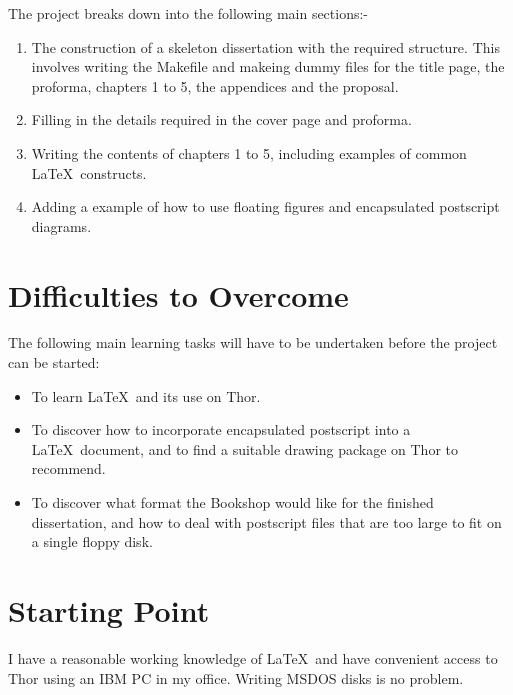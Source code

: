 The project breaks down into the following main sections:-

\begin{enumerate}

\item The construction of a skeleton dissertation with the required 
structure. This involves writing the Makefile and makeing dummy files
for the title page, the proforma, chapters 1 to 5, the appendices and
the proposal.

\item Filling in the details required in the cover page and proforma.

\item Writing the contents of chapters 1 to 5, including examples
of common \LaTeX\ constructs.

\item Adding a example of how to use floating figures and encapsulated
postscript diagrams.

\end{enumerate}

\section*{Difficulties to Overcome}

The following main learning tasks will have to be undertaken before 
the project can be started:

\begin{itemize}

\item To learn \LaTeX\ and its use on Thor.

\item To discover how to incorporate encapsulated postscript into
a \LaTeX\ document, and to find a suitable drawing package on Thor
to recommend.

\item To discover what format the Bookshop would like for the finished
dissertation, and how to deal with postscript files that are too
large to fit on a single floppy disk.

\end{itemize}



\section*{Starting Point}

I have a reasonable working knowledge of \LaTeX\ and have convenient
access to Thor using an IBM PC in my office. Writing MSDOS disks is no 
problem.

